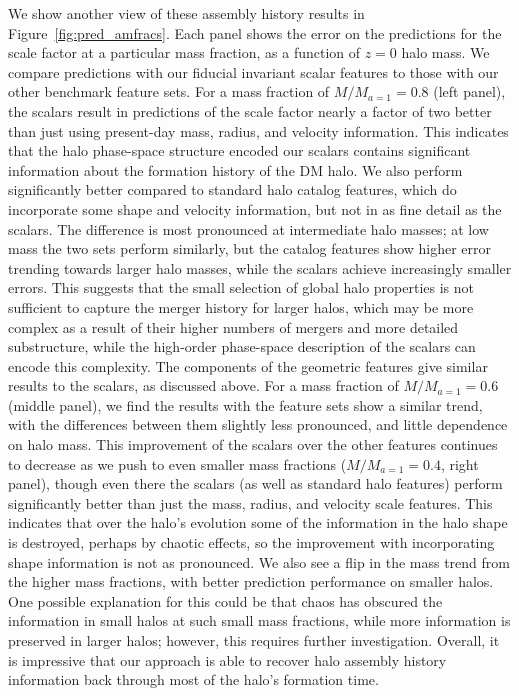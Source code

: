 We show another view of these assembly history results in Figure~\ref{fig:pred_amfracs}.
Each panel shows the error on the predictions for the scale factor at a particular mass fraction, as a function of $z=0$ halo mass. 
We compare predictions with our fiducial invariant scalar features to those with our other benchmark feature sets.
For a mass fraction of $M/M_{a=1} = 0.8$ (left panel), the scalars result in predictions of the scale factor nearly a factor of two better than just using present-day mass, radius, and velocity information.
This indicates that the halo phase-space structure encoded our scalars contains significant information about the formation history of the DM halo.
We also perform significantly better compared to standard halo catalog features, which do incorporate some shape and velocity information, but not in as fine detail as the scalars.
The difference is most pronounced at intermediate halo masses; at low mass the two sets perform similarly, but the catalog features show higher error trending towards larger halo masses, while the scalars achieve increasingly smaller errors.
This suggests that the small selection of global halo properties is not sufficient to capture the merger history for larger halos, which may be more complex as a result of their higher numbers of mergers and more detailed substructure, while the high-order phase-space description of the scalars can encode this complexity.
The components of the geometric features give similar results to the scalars, as discussed above.
For a mass fraction of $M/M_{a=1} = 0.6$ (middle panel), we find the results with the feature sets show a similar trend, with the differences between them slightly less pronounced, and little dependence on halo mass.
This improvement of the scalars over the other features continues to decrease as we push to even smaller mass fractions ($M/M_{a=1} = 0.4$, right panel), though even there the scalars (as well as standard halo features) perform significantly better than just the mass, radius, and velocity scale features.
This indicates that over the halo's evolution some of the information in the halo shape is destroyed, perhaps by chaotic effects, so the improvement with incorporating shape information is not as pronounced. 
We also see a flip in the mass trend from the higher mass fractions, with better prediction performance on smaller halos.
One possible explanation for this could be that chaos has obscured the information in small halos at such small mass fractions, while more information is preserved in larger halos; however, this requires further investigation.
Overall, it is impressive that our approach is able to recover halo assembly history information back through most of the halo's formation time.

